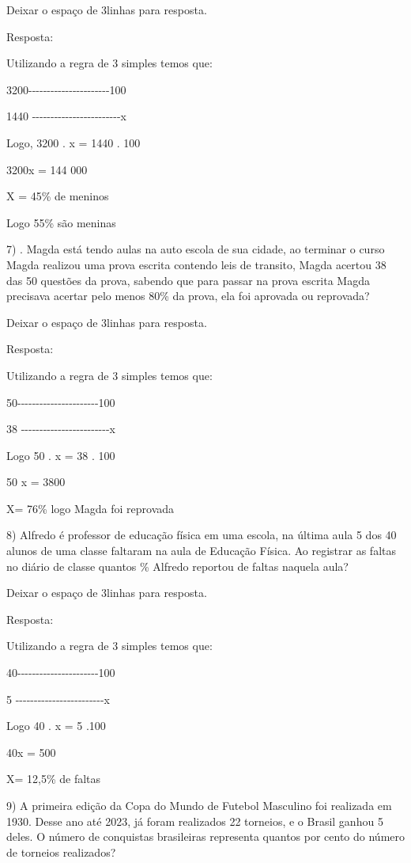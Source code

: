 Deixar o espaço de 3linhas para resposta.

Resposta:

Utilizando a regra de 3 simples temos que:

3200-\/-\/-\/-\/-\/-\/-\/-\/-\/-\/-\/-\/-\/-\/-\/-\/-\/-\/-\/-\/-\/-100

1440
-\/-\/-\/-\/-\/-\/-\/-\/-\/-\/-\/-\/-\/-\/-\/-\/-\/-\/-\/-\/-\/-\/-\/-x

Logo, 3200 . x = 1440 . 100

3200x = 144 000

X = 45\% de meninos

Logo 55\% são meninas

7) . Magda está tendo aulas na auto escola de sua cidade, ao terminar o
curso Magda realizou uma prova escrita contendo leis de transito, Magda
acertou 38 das 50 questões da prova, sabendo que para passar na prova
escrita Magda precisava acertar pelo menos 80\% da prova, ela foi
aprovada ou reprovada?

Deixar o espaço de 3linhas para resposta.

Resposta:

Utilizando a regra de 3 simples temos que:

50-\/-\/-\/-\/-\/-\/-\/-\/-\/-\/-\/-\/-\/-\/-\/-\/-\/-\/-\/-\/-\/-100

38
-\/-\/-\/-\/-\/-\/-\/-\/-\/-\/-\/-\/-\/-\/-\/-\/-\/-\/-\/-\/-\/-\/-\/-x

Logo 50 . x = 38 . 100

50 x = 3800

X= 76\% logo Magda foi reprovada

8) Alfredo é professor de educação física em uma escola, na última aula
5 dos 40 alunos de uma classe faltaram na aula de Educação Física. Ao
registrar as faltas no diário de classe quantos \% Alfredo reportou de
faltas naquela aula?

Deixar o espaço de 3linhas para resposta.

Resposta:

Utilizando a regra de 3 simples temos que:

40-\/-\/-\/-\/-\/-\/-\/-\/-\/-\/-\/-\/-\/-\/-\/-\/-\/-\/-\/-\/-\/-100

5
-\/-\/-\/-\/-\/-\/-\/-\/-\/-\/-\/-\/-\/-\/-\/-\/-\/-\/-\/-\/-\/-\/-\/-x

Logo 40 . x = 5 .100

40x = 500

X= 12,5\% de faltas

9) A primeira edição da Copa do Mundo de Futebol Masculino foi realizada
em 1930. Desse ano até 2023, já foram realizados 22 torneios, e o Brasil
ganhou 5 deles. O número de conquistas brasileiras representa quantos
por cento do número de torneios realizados?

